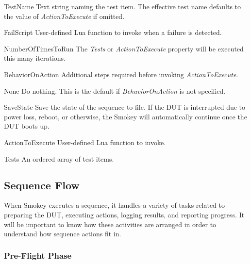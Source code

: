 \documentclass[11pt]{article}
\newcommand{\prop}[1]{{\itshape#1}}
\begin{document}
\begin{Property}

\item[TestName] Text string naming the test item.  The effective test name
	defaults to the value of \prop{ActionToExecute} if omitted.

\item[FailScript] User-defined Lua function to invoke when a failure is
	detected.

\item[NumberOfTimesToRun] The \prop{Tests} or \prop{ActionToExecute} property will be
	executed this many iterations.

\item[BehaviorOnAction] Additional steps required before invoking
	\prop{ActionToExecute}.

	\begin{Definition}

	\item[None] Do nothing.  This is the default if \prop{BehaviorOnAction} is
		not specified.

	\item[SaveState] Save the state of the sequence to file.  If the DUT
		is interrupted due to power loss, reboot, or otherwise, the
		Smokey will automatically continue once the DUT boots up.

	\end{Definition}

\item[ActionToExecute] User-defined Lua function to invoke.

\item[Tests] An ordered array of test items.

\end{Property}

\subsection{Sequence Flow}

When Smokey executes a sequence, it handles a variety of tasks related to
preparing the DUT, executing actions, logging results, and reporting progress.
It will be important to know how these activities are arranged in order to
understand how sequence actions fit in.

\subsubsection{Pre-Flight Phase}
\end{document}
